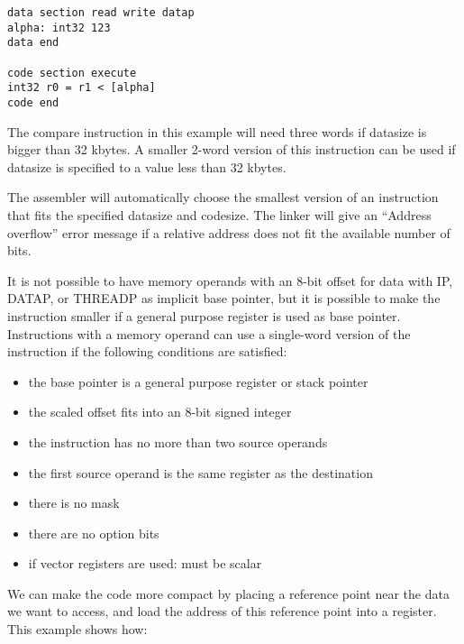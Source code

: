 \documentclass[forwardcom.tex]{subfiles}
\begin{document}
\begin{example}
\label{instructionSizeOptimization}
\end{example} %

\begin{lstlisting}[frame=single]
data section read write datap
alpha: int32 123
data end

code section execute
int32 r0 = r1 < [alpha]
code end

\end{lstlisting}

The compare instruction in this example will need three words if datasize is bigger than 32 kbytes. A smaller 2-word version of this instruction can be used if datasize is specified to a value less than 32 kbytes. 
\vv

The assembler will automatically choose the smallest version of an instruction that fits the specified datasize and codesize. The linker will give an 
``Address overflow'' error message if a relative address does not fit the available number of bits.
\vv

It is not possible to have memory operands with an 8-bit offset for data with IP, DATAP, or THREADP as implicit base pointer, but it is possible to make the instruction smaller if a general purpose register is used as base pointer. Instructions with a memory operand can use a single-word version of the instruction if the following conditions are satisfied:

\begin{itemize}
\item the base pointer is a general purpose register or stack pointer
\item the scaled offset fits into an 8-bit signed integer
\item the instruction has no more than two source operands
\item the first source operand is the same register as the destination
\item there is no mask
\item there are no option bits
\item if vector registers are used: must be scalar
\end{itemize}
\vv

We can make the code more compact by placing a reference point near the data we want to access, and load the address of this reference point into a register. This example shows how:

\begin{example}
\label{ExampleLocalPointer}
\end{example} %
\end{document}
